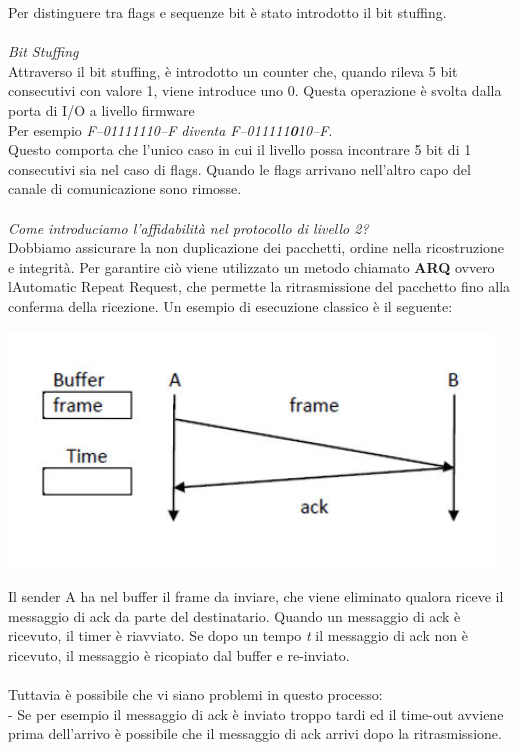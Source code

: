 \documentclass[11pt, oneside]{article}   	%
\begin{document}
Per distinguere tra flags e sequenze bit è stato introdotto il bit stuffing.\\\\
\emph{Bit Stuffing}\\
Attraverso il bit stuffing, è introdotto un counter che, quando rileva 5 bit consecutivi con valore 1, viene introduce uno 0. Questa operazione è svolta dalla porta di I/O a livello firmware\\
Per esempio \emph{F--01111110--F diventa F--011111\textbf{0}10--F}.\\
Questo comporta che l'unico caso in cui il livello possa incontrare 5 bit di 1 consecutivi sia nel caso di flags. Quando le flags arrivano nell'altro capo del canale di comunicazione sono rimosse.\\\\
\emph{Come introduciamo l'affidabilità nel protocollo di livello 2?}\\
Dobbiamo assicurare la non duplicazione dei pacchetti, ordine nella ricostruzione e integrità. Per garantire ciò viene utilizzato un metodo chiamato \textbf{ARQ} ovvero lAutomatic Repeat Request, che permette la ritrasmissione del pacchetto fino alla conferma della ricezione.
Un esempio di esecuzione classico è il seguente:
\begin{center}
\includegraphics[scale=0.6]{l2}
\end{center}
Il sender A ha nel buffer il frame da inviare, che viene eliminato qualora riceve il messaggio di ack da parte del destinatario. Quando un messaggio di ack è ricevuto, il timer è riavviato. Se dopo un tempo \emph{t} il messaggio di ack non è ricevuto, il messaggio è ricopiato dal buffer e re-inviato.\\\\
Tuttavia è possibile che vi siano problemi in questo processo:\\
- Se per esempio il messaggio di ack è inviato troppo tardi ed il time-out avviene prima dell'arrivo è possibile che il messaggio di ack arrivi dopo la ritrasmissione.\\
\end{document}
